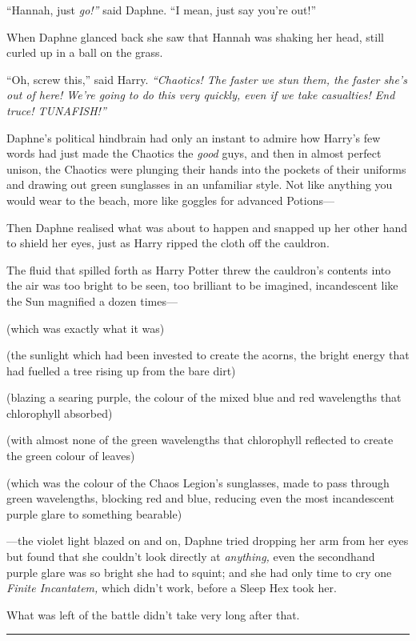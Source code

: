 ``Hannah, just \emph{go!''} said Daphne. ``I mean, just say you're
out!''

When Daphne glanced back she saw that Hannah was shaking her head, still
curled up in a ball on the grass.

``Oh, screw this,'' said Harry. \emph{``Chaotics! The faster we stun
them, the faster she's out of here! We're going to do this very quickly,
even if we take casualties! End truce! TUNAFISH!''}

Daphne's political hindbrain had only an instant to admire how Harry's
few words had just made the Chaotics the \emph{good} guys, and then in
almost perfect unison, the Chaotics were plunging their hands into the
pockets of their uniforms and drawing out green sunglasses in an
unfamiliar style. Not like anything you would wear to the beach, more
like goggles for advanced Potions---

Then Daphne realised what was about to happen and snapped up her other
hand to shield her eyes, just as Harry ripped the cloth off the
cauldron.

The fluid that spilled forth as Harry Potter threw the cauldron's
contents into the air was too bright to be seen, too brilliant to be
imagined, incandescent like the Sun magnified a dozen times---

(which was exactly what it was)

(the sunlight which had been invested to create the acorns, the bright
energy that had fuelled a tree rising up from the bare dirt)

(blazing a searing purple, the colour of the mixed blue and red
wavelengths that chlorophyll absorbed)

(with almost none of the green wavelengths that chlorophyll reflected to
create the green colour of leaves)

(which was the colour of the Chaos Legion's sunglasses, made to pass
through green wavelengths, blocking red and blue, reducing even the most
incandescent purple glare to something bearable)

---the violet light blazed on and on, Daphne tried dropping her arm from
her eyes but found that she couldn't look directly at \emph{anything,}
even the secondhand purple glare was so bright she had to squint; and
she had only time to cry one \emph{Finite Incantatem,} which didn't
work, before a Sleep Hex took her.

What was left of the battle didn't take very long after that.

\begin{center}\rule{3in}{0.4pt}\end{center}

